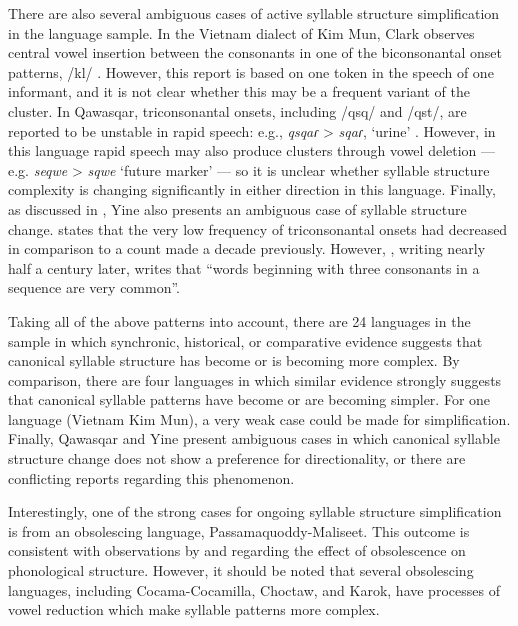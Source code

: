   There are also several ambiguous cases of active syllable structure simplification in the language sample. In the Vietnam dialect of Kim Mun, Clark observes central vowel insertion between the consonants in one of the biconsonantal onset patterns, /kl/ \citep[127]{Clark2008}. However, this report is based on one token in the speech of one informant, and it is not clear whether this may be a frequent variant of the cluster. In Qawasqar, triconsonantal onsets, including /qsq/ and /qst/, are reported to be unstable in rapid speech: e.g., \textit{qsqaɾ} > \textit{sqaɾ}, ‘urine’ \citep[393]{Clairis1985}. However, in this language rapid speech may also produce clusters through vowel deletion — e.g. \textit{seqwe} > \textit{sqwe} ‘future marker’ — so it is unclear whether syllable structure complexity is changing significantly in either direction in this language. Finally, as discussed in , Yine also presents an ambiguous case of syllable structure change. \citet[24]{Matteson1965} states that the very low frequency of triconsonantal onsets had decreased in comparison to a count made a decade previously. However, \citet[27]{Hanson2010}, writing nearly half a century later, writes that “words beginning with three consonants in a sequence are very common”.

  Taking all of the above patterns into account, there are 24 languages in the sample in which synchronic, historical, or comparative evidence suggests that canonical syllable structure has become or is becoming more complex. By comparison, there are four languages in which similar evidence strongly suggests that canonical syllable patterns have become or are becoming simpler. For one language (Vietnam Kim Mun), a very weak case could be made for simplification. Finally, Qawasqar and Yine present ambiguous cases in which canonical syllable structure change does not show a preference for directionality, or there are conflicting reports regarding this phenomenon.

  Interestingly, one of the strong cases for ongoing syllable structure simplification is from an obsolescing language, Passamaquoddy-Maliseet. This outcome is consistent with observations by \citet{Romaine2010} and \citet{Cook1989} regarding the effect of obsolescence on phonological structure. However, it should be noted that several obsolescing languages, including Cocama-Cocamilla, Choctaw, and Karok, have processes of vowel reduction which make syllable patterns more complex.


